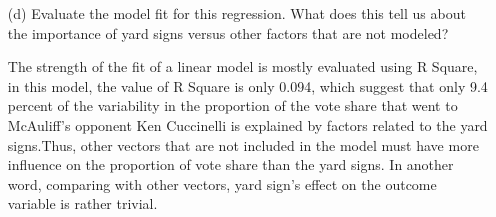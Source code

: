 \documentclass[12pt,letterpaper]{article}
\begin{document}
\begin{enumerate}
	
	\vspace{4cm}
	
	\item [(d)] Evaluate the model fit for this regression.  What does this	tell us about the importance of yard signs versus other factors that are not modeled?
	
	The strength of the fit of a linear model is mostly evaluated using R Square, in this model, the value of R Square is only 0.094, which suggest that only 9.4 percent  of the variability in the proportion of the vote share that went to McAuliff’s opponent Ken Cuccinelli is explained by factors related to the yard signs.Thus, other vectors that are not included in the model must have more influence on the proportion of vote share than the yard signs. In another word, comparing with other vectors, yard sign's effect on the outcome variable is rather trivial.
	
	
\end{enumerate}  

\newpage
\end{document}
